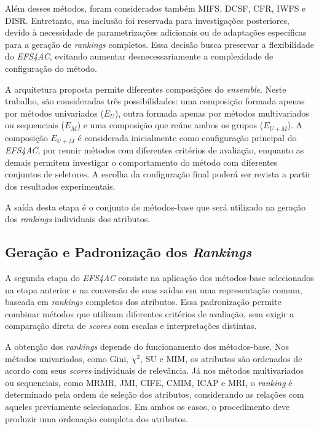 Além desses métodos, foram considerados também MIFS, DCSF, CFR, IWFS e DISR. Entretanto, sua inclusão foi reservada para investigações posteriores, devido à necessidade de parametrizações adicionais ou de adaptações específicas para a geração de \textit{rankings} completos. Essa decisão busca preservar a flexibilidade do \textit{EFS4AC}, evitando aumentar desnecessariamente a complexidade de configuração do método.

A arquitetura proposta permite diferentes composições do \textit{ensemble}. Neste trabalho, são consideradas três possibilidades: uma composição formada apenas por métodos univariados ($E_U$), outra formada apenas por métodos multivariados ou sequenciais ($E_M$) e uma composição que reúne ambos os grupos ($E_{U+M}$). A composição $E_{U+M}$ é considerada inicialmente como configuração principal do \textit{EFS4AC}, por reunir métodos com diferentes critérios de avaliação, enquanto as demais permitem investigar o comportamento do método com diferentes conjuntos de seletores. A escolha da configuração final poderá ser revista a partir dos resultados experimentais.

A saída desta etapa é o conjunto de métodos-base que será utilizado na geração dos \textit{rankings} individuais dos atributos.

\subsection{Geração e Padronização dos \textit{Rankings}}\label{sec:ac-efs-etapa2}

A segunda etapa do \textit{EFS4AC} consiste na aplicação dos métodos-base selecionados na etapa anterior e na conversão de suas saídas em uma representação comum, baseada em \textit{rankings} completos dos atributos. Essa padronização permite combinar métodos que utilizam diferentes critérios de avaliação, sem exigir a comparação direta de \textit{scores} com escalas e interpretações distintas.

A obtenção dos \textit{rankings} depende do funcionamento dos métodos-base. Nos métodos univariados, como Gini, $\chi^2$, SU e MIM, os atributos são ordenados de acordo com seus \textit{scores} individuais de relevância. Já nos métodos multivariados ou sequenciais, como MRMR, JMI, CIFE, CMIM, ICAP e MRI, o \textit{ranking} é determinado pela ordem de seleção dos atributos, considerando as relações com aqueles previamente selecionados. Em ambos os casos, o procedimento deve produzir uma ordenação completa dos atributos.

